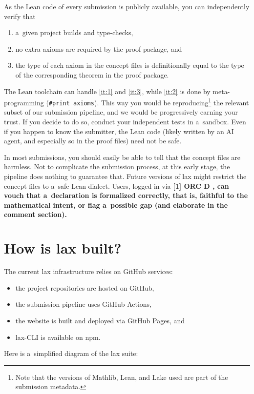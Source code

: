 \documentclass[11pt,a4paper]{article}
\newcommand{\ORCID}{%
  \begingroup
  \fontfamily{phv}\selectfont\bfseries
  \scalebox{0.93}[1]{%
    \textcolor{orcidgray}{ORC}%
    \textcolor{orcidgreen}{%
      \makebox[0.29em][c]{%
        \ooalign{%
          \hfil I\hfil\cr
          \hfil\raisebox{0.79em}{\rule{0.15em}{0.15em}}\hfil\cr
        }%
      }%
      D%
    }%
  }%
  \endgroup
}
\begin{document}
As the Lean code of every submission is publicly available, you can independently verify that
\begin{enumerate}[label=(\arabic*)]
\item\label{it:1} a~given project builds and type-checks,
\item\label{it:2} no extra axioms are required by the proof package, and
\item\label{it:3} the type of each axiom in the concept files is definitionally equal to the type of the corresponding theorem in the proof package.
\end{enumerate}
The Lean toolchain can handle \ref{it:1} and \ref{it:3}, while \ref{it:2} is done by meta-programming (\verb|#print axioms|).
This way you would be reproducing\footnote{Note that the versions of Mathlib, Lean, and Lake used are part of the submission metadata.} the relevant subset of our submission pipeline, and we would be progressively earning your trust.
If you decide to do so, conduct your independent tests in a~sandbox.
Even if you happen to know the submitter, the Lean code (likely written by an AI agent, and especially so in the proof files) need not be safe.

\medskip

In most submissions, you should easily be able to tell that the concept files are harmless.
Not to complicate the submission process, at this early stage, the pipeline does nothing to guarantee that.
Future versions of lax might restrict the concept files to a~safe Lean dialect.
Users, logged in via \ORCID, can vouch that a~declaration is formalized correctly, that is, faithful to the mathematical intent, or flag a~possible gap (and elaborate in the comment section).

\section{How is lax built?}

The current lax infrastructure relies on GitHub services:
\begin{itemize}
  \item the project repositories are hosted on GitHub,  
  \item the submission pipeline uses GitHub Actions,
  \item the website is built and deployed via GitHub Pages, and
  \item \textsf{lax-CLI} is available on npm.
\end{itemize}
Here is a~simplified diagram of the lax suite:
\end{document}
